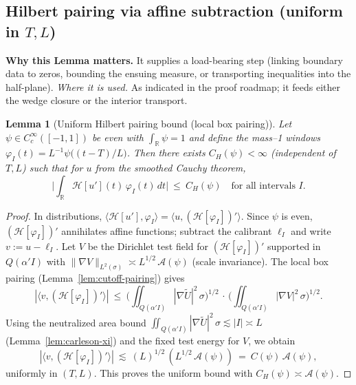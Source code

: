 \documentclass[11pt]{article}
\newtheorem{lemma}{Lemma}[section]
\theoremstyle{definition}
\theoremstyle{remark}
\newcommand{\R}{\mathbb{R}}
\begin{document}
\vspace{1.0cm}

\subsection*{Hilbert pairing via affine subtraction (uniform in $T,L$)}





\vspace{1.0cm}
\noindent\textbf{Why this Lemma matters.} It supplies a load-bearing step (linking boundary data to zeros, bounding the ensuing measure, or transporting inequalities into the half-plane).
\noindent\textit{Where it is used.} As indicated in the proof roadmap; it feeds either the wedge closure or the interior transport.
\begin{lemma}[Uniform Hilbert pairing bound (local box pairing)]
\label{lem:hilbert-H1BMO}
Let $\psi\in C_c^\infty([-1,1])$ be even with $\int_\R\psi=1$ and define the mass--1 windows $\varphi_I(t)=L^{-1}\psi\big((t-T)/L\big)$. Then there exists $C_H(\psi)<\infty$ (independent of $T,L$) such that for $u$ from the smoothed Cauchy theorem,
\[
  \Big|\int_\R \mathcal H[u'](t)\,\varphi_I(t)\,dt\Big|\ \le\ C_H(\psi)\quad\text{for all intervals }I.
\]
\end{lemma}
\begin{proof}
In distributions, $\langle \mathcal H[u'],\varphi_I\rangle=\langle u,(\mathcal H[\varphi_I])'\rangle$. Since $\psi$ is even, $(\mathcal H[\varphi_I])'$ annihilates affine functions; subtract the calibrant $\ell_I$ and write $v:=u-\ell_I$. Let $V$ be the Dirichlet test field for $(\mathcal H[\varphi_I])'$ supported in $Q(\alpha'I)$ with $\|\nabla V\|_{L^2(\sigma)}\asymp L^{1/2}\,\mathcal A(\psi)$ (scale invariance). The local box pairing (Lemma~\ref{lem:cutoff-pairing}) gives
\[
  |\langle v,(\mathcal H[\varphi_I])'\rangle|\ \le\ \Big(\iint_{Q(\alpha'I)} |\nabla \widetilde U|^2\,\sigma\Big)^{1/2}\,\cdot\,\Big(\iint_{Q(\alpha'I)} |\nabla V|^2\,\sigma\Big)^{1/2}.
\]
Using the neutralized area bound $\iint_{Q(\alpha'I)} |\nabla \widetilde U|^2\,\sigma\lesssim |I|\asymp L$ (Lemma~\ref{lem:carleson-xi}) and the fixed test energy for $V$, we obtain
\[
  |\langle v,(\mathcal H[\varphi_I])'\rangle|\ \lesssim\ (L)^{1/2}\,(L^{1/2}\,\mathcal A(\psi))\ =\ C(\psi)\,\mathcal A(\psi),
\]
uniformly in $(T,L)$. This proves the uniform bound with $C_H(\psi)\asymp \mathcal A(\psi)$.
\end{proof}
\end{document}
